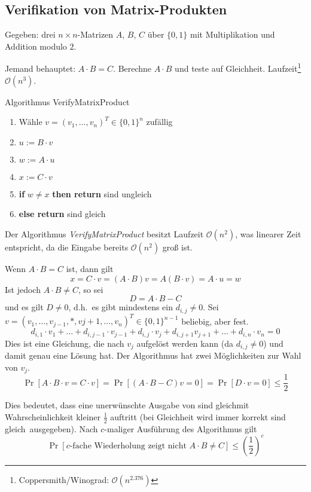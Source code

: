 \subsection{Verifikation von Matrix-Produkten}
Gegeben: drei $n \times n$-Matrizen $A$, $B$, $C$ über $\{0, 1\}$ mit
Multiplikation und Addition modulo $2$.

Jemand behauptet: $A\cdot B = C$. Berechne $A\cdot B$ und teste auf Gleichheit.
Laufzeit\footnote{Coppersmith/Winograd: $\mathcal{O}(n^{2.376})$}
$\mathcal{O}(n^3)$.

\begin{algorithm}
	\caption{Algorithmus VerifyMatrixProduct}
	\vspace{0.4cm}
	\begin{enumerate}
		\setlength{\itemsep}{2pt}
		\setlength{\parskip}{2pt}
		\setlength{\parsep}{2pt}
		\item Wähle $v = \left(v_1, \dots, v_n\right)^T \in \{0, 1\}^n$ zufällig
		\item $u := B\cdot v$
		\item $w := A\cdot u$
		\item $x := C\cdot v$
		\item \textbf{if} $w \not= x$ \textbf{then return} \glqq sind ungleich\grqq
		\item[] \textbf{else return} \glqq sind gleich\grqq
	\end{enumerate}
\end{algorithm}

Der Algorithmus \emph{VerifyMatrixProduct} besitzt Laufzeit $\mathcal{O}(n^2)$,
was linearer Zeit entspricht, da die Eingabe bereits $\mathcal{O}(n^2)$ groß ist.

Wenn $A\cdot B = C$ ist, dann gilt
\[
  x = C \cdot v = \left( A \cdot B \right) v = A \left( B \cdot v \right) = A \cdot u = w
\]
Ist jedoch $A\cdot B \not= C$, so sei
\[
  D = A\cdot B - C
\]
und es gilt $D \not= 0$, d.h.\ es gibt mindestens ein $d_{i,j} \not= 0$. Sei $v
= \left( v_1, \dots, v_{j-1}, \ast, v{j+1}, \dots, v_n \right)^T \in \{0,
1\}^{n-1}$ beliebig, aber fest.
\[
  d_{i,1} \cdot v_1 + \dots + d_{i,j-1} \cdot v_{j-1} + d_{i,j} \cdot v_j +
  d_{i,j+1} v_{j+1} + \dots + d_{i,n} \cdot v_n = 0
\]
Dies ist eine Gleichung, die nach $v_j$ aufgelöst werden kann (da $d_{i,j}
\not= 0$) und damit genau eine Lösung hat. Der Algorithmus hat zwei
Möglichkeiten zur Wahl von $v_j$.
\[
  \Pr\left[ A\cdot B \cdot v = C \cdot v \right] = \Pr\left[ \left(A\cdot B -
  C\right) v = 0 \right] = \Pr\left[ D \cdot v = 0 \right] \leq \frac{1}{2}
\]

Dies bedeutet, dass eine unerwünschte Ausgabe von \glqq sind gleich\grqq mit
Wahrscheinlichkeit kleiner $\frac{1}{2}$ auftritt (bei Gleichheit wird immer
korrekt \glqq sind gleich\grqq\ ausgegeben). Nach $c$-maliger Ausführung des
Algorithmus gilt
\[
  \Pr\left[ \text{$c$-fache Wiederholung zeigt nicht $A\cdot B \not= C$}
  \right] \leq \left(\frac{1}{2}\right)^c
\]
